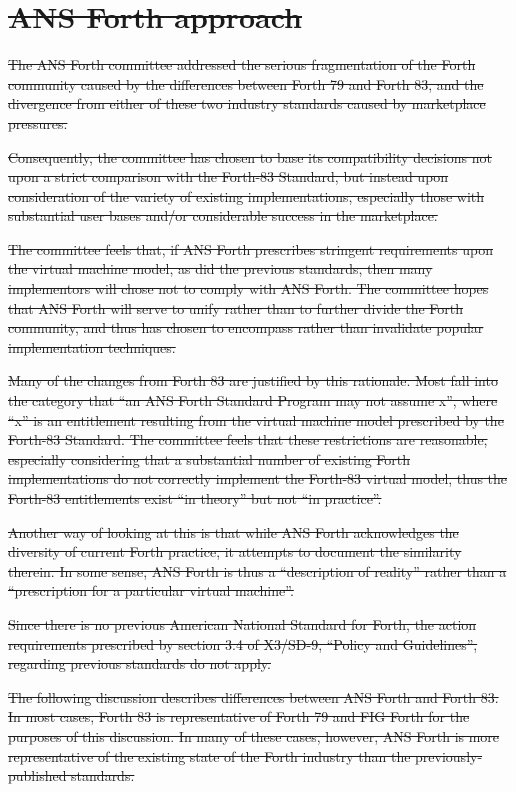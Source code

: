 \section[ANS Forth approach]{\sout{ANS Forth approach}} %
\label{diff:ans}

\sout{%
The ANS Forth committee addressed the serious fragmentation of the
Forth community caused by the differences between Forth 79 and
Forth 83, and the divergence from either of these two industry
standards caused by marketplace pressures.}

\sout{%
Consequently, the committee has chosen to base its compatibility
decisions not upon a strict comparison with the Forth-83 Standard,
but instead upon consideration of the variety of existing
implementations, especially those with substantial user bases and/or
considerable success in the marketplace.}

\sout{%
The committee feels that, if ANS Forth prescribes stringent
requirements upon the virtual machine model, as did the previous
standards, then many implementors will chose not to comply with
ANS Forth. The committee hopes that ANS Forth will serve to unify
rather than to further divide the Forth community, and thus
has chosen to encompass rather than invalidate popular implementation
techniques.}

\sout{%
Many of the changes from Forth 83 are justified by this rationale.
Most fall into the category that ``an ANS Forth Standard Program may
not assume x'', where ``x'' is an entitlement resulting from the
virtual machine model prescribed by the Forth-83 Standard. The
committee feels that these restrictions are reasonable, especially
considering that a substantial number of existing Forth implementations
do not correctly implement the Forth-83 virtual model, thus the Forth-83
entitlements exist ``in theory'' but not ``in practice''.}

\sout{%
Another way of looking at this is that while ANS Forth acknowledges
the diversity of current Forth practice, it attempts to document the
similarity therein. In some sense, ANS Forth is thus a ``description
of reality'' rather than a ``prescription for a particular virtual
machine''.}

\sout{%
Since there is no previous American National Standard for Forth, the
action requirements prescribed by section 3.4 of X3/SD-9,
``Policy and Guidelines'', regarding previous standards do not apply.
}

\sout{%
The following discussion describes differences between ANS Forth and
Forth 83. In most cases, Forth 83 is representative of Forth 79 and
FIG Forth for the purposes of this discussion. In many of these cases,
however, ANS Forth is more representative of the existing state of the
Forth industry than the previously-published standards.
}

